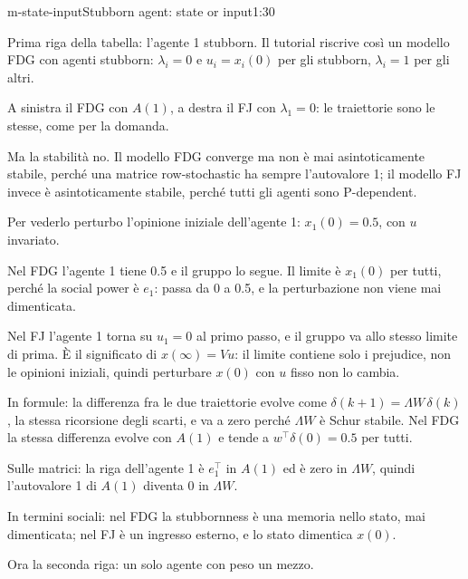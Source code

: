 \begin{slidedue}{m-state-input}{Stubborn agent: state or input}{1:30}
  \begin{discorso}
    \item Prima riga della tabella: l'agente 1 stubborn. Il tutorial riscrive così un modello FDG con agenti stubborn: $\lambda_i=0$ e $u_i=x_i(0)$ per gli stubborn, $\lambda_i=1$ per gli altri.
    \item A sinistra il FDG con $A(1)$, a destra il FJ con $\lambda_1=0$: le traiettorie sono le stesse, come per la domanda.
    \item Ma la stabilità no. Il modello FDG converge ma non è mai asintoticamente stabile, perché una matrice row-stochastic ha sempre l'autovalore 1; il modello FJ invece è asintoticamente stabile, perché tutti gli agenti sono P-dependent.
    \item \clic Per vederlo perturbo l'opinione iniziale dell'agente 1: $x_1(0)=0.5$, con $u$ invariato.
    \item Nel FDG l'agente 1 tiene 0.5 e il gruppo lo segue. Il limite è $x_1(0)$ per tutti, perché la social power è $e_1$: passa da 0 a 0.5, e la perturbazione non viene mai dimenticata.
    \item Nel FJ l'agente 1 torna su $u_1=0$ al primo passo, e il gruppo va allo stesso limite di prima. È il significato di $x(\infty)=Vu$: il limite contiene solo i prejudice, non le opinioni iniziali, quindi perturbare $x(0)$ con $u$ fisso non lo cambia.
    \item In formule: la differenza fra le due traiettorie evolve come $\delta(k+1)=\Lambda W\,\delta(k)$, la stessa ricorsione degli scarti, e va a zero perché $\Lambda W$ è Schur stabile. Nel FDG la stessa differenza evolve con $A(1)$ e tende a $w^\top\delta(0)=0.5$ per tutti.
    \item Sulle matrici: la riga dell'agente 1 è $e_1^\top$ in $A(1)$ ed è zero in $\Lambda W$, quindi l'autovalore 1 di $A(1)$ diventa 0 in $\Lambda W$.
    \item In termini sociali: nel FDG la stubbornness è una memoria nello stato, mai dimenticata; nel FJ è un ingresso esterno, e lo stato dimentica $x(0)$.
    \item Ora la seconda riga: un solo agente con peso un mezzo.
  \end{discorso}
\end{slidedue}

